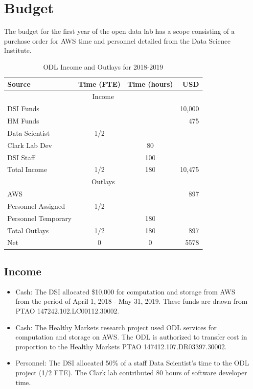 \section{Budget} %
The budget for the first year of the open data lab has a scope consisting of a purchase order for AWS time and personnel detailed from the Data Science Institute.

\begin{table}[htbp]
\begin{center}
\begin{tabular}{lccr}
\hline
\hline
Source & Time (FTE) & Time (hours) & USD \\
\hline
\multicolumn{4}{c}{Income} \\
\hline
DSI Funds & && 10,000 \\
HM Funds & && 475 \\
Data Scientist & 1/2 & & \\
Clark Lab Dev & & 80 & \\
DSI Staff & & 100 & \\
\hline
Total Income & 1/2  & 180 & 10,475 \\
\hline
\hline
\multicolumn{4}{c}{Outlays} \\
\hline
AWS & && 897 \\
Personnel Assigned & 1/2  &  & \\
Personnel Temporary & & 180 & \\
\hline
Total Outlays & 1/2  & 180 & 897 \\
\hline
\hline
Net & 0 & 0 & 5578 \\
\hline
\hline
\end{tabular}
\caption{ODL Income and Outlays for 2018-2019}
\end{center}
\end{table}

\subsection{Income}
\begin{itemize}
\item Cash: The DSI allocated \$10,000 for computation and storage from AWS from the period of April 1, 2018 - May 31, 2019. These funds are drawn from PTAO 147242.102.LC00112.30002.
\item Cash: The Healthy Markets research project used ODL services for computation and storage on AWS. The ODL is authorized to transfer cost in proportion to the Healthy Markets PTAO 147412.107.DR03397.30002.
\item Personnel: The DSI allocated 50\% of a staff Data Scientist's time to the ODL project (1/2 FTE). The Clark lab contributed 80 hours of software developer time.
\end{itemize}
